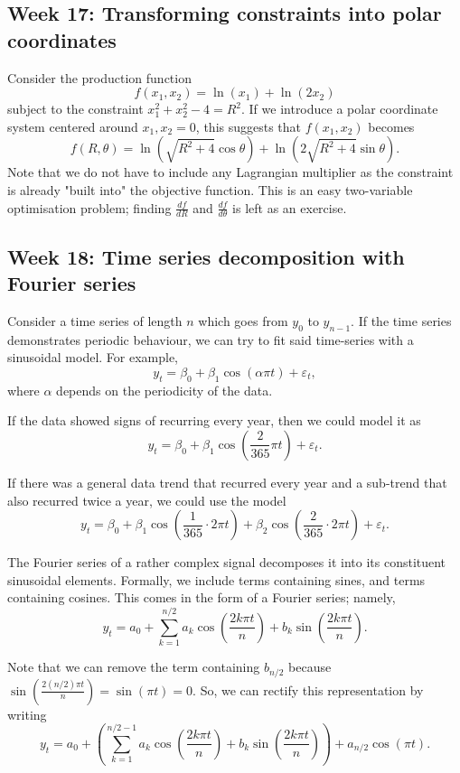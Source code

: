 \documentclass[a4paper, 12pt,oneside,openany]{book}
\begin{document}
\subsection{Week 17: Transforming constraints into polar coordinates}

Consider the production function $$f(x_1, x_2) = \ln(x_1) + \ln(2x_2)$$ subject to the constraint $x_1^2+x_2^2-4=R^2$. If we introduce a polar coordinate system centered around $x_1, x_2=0$, this suggests that $f(x_1,x_2)$ becomes $$f(R, \theta)=\ln(\sqrt{R^2+4} \cos\theta)+ \ln(2\sqrt{R^2+4}\sin\theta).$$ Note that we do not have to include any Lagrangian multiplier as the constraint is already "built into" the objective function. This is an easy two-variable optimisation problem; finding $\frac{df}{dR}$ and $\frac{df}{d\theta}$ is left as an exercise.

\subsection{Week 18: Time series decomposition with Fourier series}

Consider a time series of length $n$ which goes from $y_0$ to $y_{n-1}$. If the time series demonstrates periodic behaviour, we can try to fit said time-series with a sinusoidal model. For example, $$y_t = \beta_0 + \beta_1 \cos (\alpha\pi t)+\varepsilon_t,$$ where $\alpha$ depends on the periodicity of the data. 

If the data showed signs of recurring every year, then we could model it as $$y_t = \beta_0 + \beta_1 \cos \left(\frac{2}{365}\pi t\right)+\varepsilon_t.$$

If there was a general data trend that recurred every year and a sub-trend that also recurred twice a year, we could use the model $$y_t = \beta_0 + \beta_1 \cos \left(\frac{1}{365}\cdot 2\pi t\right)+ \beta_2 \cos \left(\frac{2}{365}\cdot 2\pi t\right)+\varepsilon_t.$$

The Fourier series of a rather complex signal decomposes it into its constituent sinusoidal elements. Formally, we include terms containing sines, and terms containing cosines. This comes in the form of a Fourier series; namely, $$y_t = a_0 + \sum\limits_{k=1}^{n/2} a_k \cos\left(\frac{2k\pi t}{n}\right)+ b_k \sin \left(\frac{2k\pi t}{n}\right).$$

Note that we can remove the term containing $b_{n/2}$ because $\sin (\frac{2(n/2)\pi t}{n})=\sin(\pi t)=0.$ So, we can rectify this representation by writing $$y_t = a_0 + \left(\sum\limits_{k=1}^{n/2-1} a_k \cos\left(\frac{2k\pi t}{n}\right)+ b_k \sin \left(\frac{2k\pi t}{n}\right)\right) + a_{n/2} \cos(\pi t).$$
\end{document}
